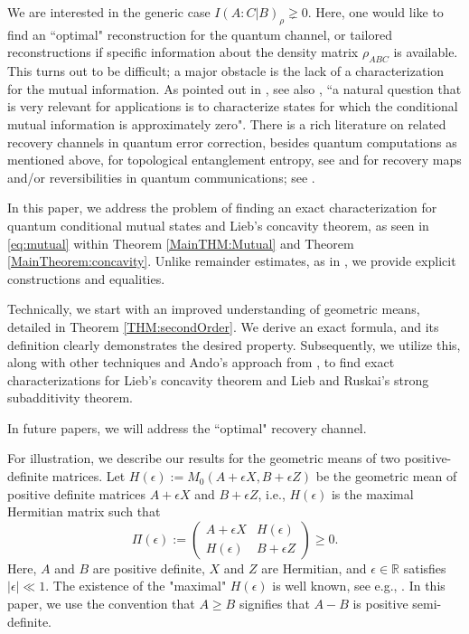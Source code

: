 \documentclass{article}
\numberwithin{equation}{section}
\begin{document}
We are interested in the generic case $I(A: C|B)_\rho \gneq 0$. Here, one would like to find an ``optimal" reconstruction for the quantum channel, or tailored reconstructions if specific information about the density matrix $\rho_{ABC}$ is available. This turns out to be difficult; a major obstacle is the lack of a characterization for the mutual information. As pointed out in \cite{FawziRenner2015}, see also \cite{Sutter2018}, ``a natural question that is very relevant for applications is to characterize states for which the conditional mutual information is approximately zero". There is a rich literature on related recovery channels in quantum error correction, besides quantum computations as mentioned above, for topological entanglement entropy, see \cite{KitaevPreskill2006, LevinWen2006, ShiKatoKim2020, MLevin2024, KimLevinEtc2023, KatoBrandao2020} and for recovery maps and/or reversibilities in quantum communications; see \cite{LindenWinter2005, Brandao2010, FawziRenner2015, Sutter2018, SutterFawziRenner2016, CarlenVershynina2018, DattaWilde2015, JuneRenner2018, HaydenJosPetzWinter2004, berta2014monotonicity, Wilde2015}.

In this paper, we address the problem of finding an exact characterization for quantum conditional mutual states and Lieb's concavity theorem, as seen in \eqref{eq:mutual} within Theorem \ref{MainTHM:Mutual} and Theorem \ref{MainTheorem:concavity}. Unlike remainder estimates, as in \cite{CarlenLieb2012, CarlenLieb2014, FawziRenner2015, SutterFawziRenner2016, JuneRenner2018, CarlenVershynina2020}, we provide explicit constructions and equalities.

Technically, we start with an improved understanding of geometric means, detailed in Theorem \ref{THM:secondOrder}. We derive an exact formula, and its definition clearly demonstrates the desired property. Subsequently, we utilize this, along with other techniques and Ando's approach from \cite{ANDO1979203}, to find exact characterizations for Lieb's concavity theorem and Lieb and Ruskai's strong subadditivity theorem.


In future papers, we will address the ``optimal" recovery channel.

For illustration, we describe our results for the geometric means of two positive-definite matrices. Let $H(\epsilon):=M_{0}(A+\epsilon X, B+\epsilon Z)$ be the geometric mean of positive definite matrices $A+\epsilon X$ and $B+\epsilon Z$, i.e., $H(\epsilon)$ is the maximal Hermitian matrix such that
\begin{equation*}
\Pi(\epsilon):=
\begin{pmatrix}
A+\epsilon X & H(\epsilon) \\
H(\epsilon) & B+ \epsilon Z
\end{pmatrix}\geq 0.
\end{equation*} 
Here, $A$ and $B$ are positive definite, $X$ and $Z$ are Hermitian, and $\epsilon\in \mathbb{R}$ satisfies $|\epsilon|\ll 1$. The existence of the "maximal" $H(\epsilon)$ is well known, see e.g., \cite{carlen2010trace}. In this paper, we use the convention that $A\geq B$ signifies that $A-B$ is positive semi-definite.
\end{document}
